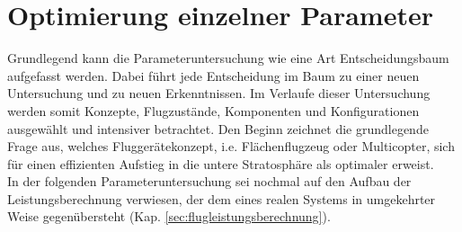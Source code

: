 \chapter{Optimierung einzelner Parameter}
\label{chap:parameteruntersuchung}

Grundlegend kann die Parameteruntersuchung wie eine Art Entscheidungsbaum aufgefasst werden. Dabei führt jede Entscheidung im Baum zu einer neuen Untersuchung und zu neuen Erkenntnissen. Im Verlaufe dieser Untersuchung werden somit Konzepte, Flugzustände, Komponenten und Konfigurationen ausgewählt und intensiver betrachtet. Den Beginn zeichnet die grundlegende Frage aus, welches Fluggerätekonzept, i.e. Flächenflugzeug oder Multicopter, sich für einen effizienten Aufstieg in die untere Stratosphäre als optimaler erweist. \\
In der folgenden Parameteruntersuchung sei nochmal auf den Aufbau der Leistungsberechnung verwiesen, der dem eines realen Systems in umgekehrter Weise gegenübersteht (Kap. \ref{sec:flugleistungsberechnung}).


